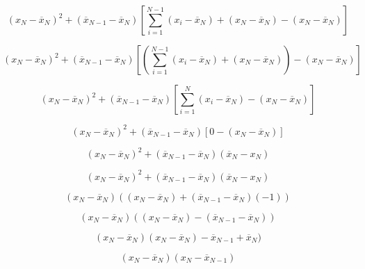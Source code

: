 \documentclass{article}
\newcommand*\mean[1]{\overline{#1}}
\begin{document}
\begin{equation}
     (x_N - \mean{x}_N)^2 + (\mean{x}_{N-1} - \mean{x}_N)[\sum_{i=1}^{N-1} (x_i - \mean{x}_N) + (x_N - \mean{x}_N) - (x_N - \mean{x}_N)]
\end{equation}

\begin{equation}
     (x_N - \mean{x}_N)^2 + (\mean{x}_{N-1} - \mean{x}_N)[(\sum_{i=1}^{N-1} (x_i - \mean{x}_N) + (x_N - \mean{x}_N)) - (x_N - \mean{x}_N)]
\end{equation}


\begin{equation}
     (x_N - \mean{x}_N)^2 + (\mean{x}_{N-1} - \mean{x}_N)[\sum_{i=1}^{N} (x_i - \mean{x}_N) - (x_N - \mean{x}_N)]
\end{equation}


\begin{equation}
     (x_N - \mean{x}_N)^2 + (\mean{x}_{N-1} - \mean{x}_N)[0 - (x_N - \mean{x}_N)]
\end{equation}

\begin{equation}
     (x_N - \mean{x}_N)^2 + (\mean{x}_{N-1} - \mean{x}_N)(\mean{x}_N - x_N)
\end{equation}

\begin{equation}
     (x_N - \mean{x}_N)^2 + (\mean{x}_{N-1} - \mean{x}_N)(\mean{x}_N - x_N)
\end{equation}

\begin{equation}
    (x_N - \mean{x}_N) ((x_N - \mean{x}_N) + (\mean{x}_{N-1} - \mean{x}_N)(-1))
\end{equation}

\begin{equation}
    (x_N - \mean{x}_N) ((x_N - \mean{x}_N) - (\mean{x}_{N-1} - \mean{x}_N))
\end{equation}

\begin{equation}
    (x_N - \mean{x}_N) (x_N - \mean{x}_N)- \mean{x}_{N-1} + \mean{x}_N)
\end{equation}

\begin{equation}
    (x_N - \mean{x}_N) (x_N - \mean{x}_{N-1})
\end{equation}
\end{document}
